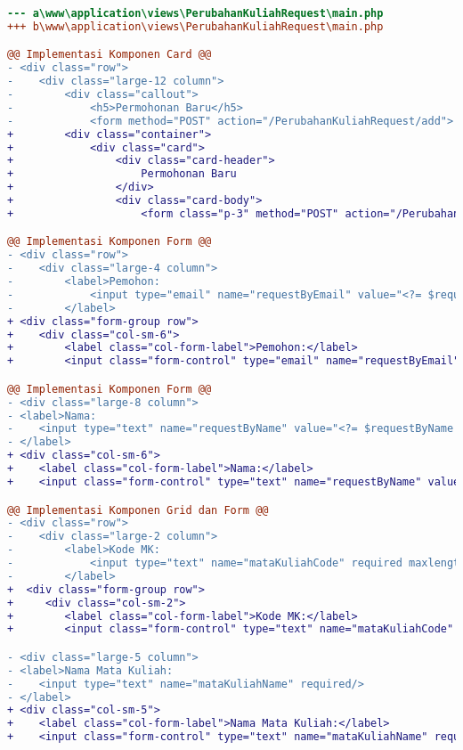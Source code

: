 \begin{lstlisting}[language=diff, caption=Perubahan file \path{\views\PerubahanKuliahRequest\main.php} , label=Entri, basicstyle=\ttfamily, frame=single,
columns=fullflexible, keepspaces=true, breaklines=true]
--- a\www\application\views\PerubahanKuliahRequest\main.php
+++ b\www\application\views\PerubahanKuliahRequest\main.php

@@ Implementasi Komponen Card @@
- <div class="row">
-    <div class="large-12 column">
-        <div class="callout">
-            <h5>Permohonan Baru</h5>
-            <form method="POST" action="/PerubahanKuliahRequest/add">
+        <div class="container">
+            <div class="card">
+                <div class="card-header">
+                    Permohonan Baru
+                </div>
+                <div class="card-body">
+                    <form class="p-3" method="POST" action="/PerubahanKuliahRequest/add">

@@ Implementasi Komponen Form @@
- <div class="row">
-    <div class="large-4 column">
-        <label>Pemohon:
-            <input type="email" name="requestByEmail" value="<?= $requestByEmail ?>" readonly="readonly"/>
-        </label>
+ <div class="form-group row">
+    <div class="col-sm-6">
+        <label class="col-form-label">Pemohon:</label>
+        <input class="form-control" type="email" name="requestByEmail" value="<?= $requestByEmail ?>" 

@@ Implementasi Komponen Form @@
- <div class="large-8 column">
- <label>Nama:
-    <input type="text" name="requestByName" value="<?= $requestByName ?>" readonly="readonly"/>
- </label>
+ <div class="col-sm-6">
+    <label class="col-form-label">Nama:</label>
+    <input class="form-control" type="text" name="requestByName" value="<?= $requestByName ?>" readonly="readonly"/>

@@ Implementasi Komponen Grid dan Form @@
- <div class="row">
-    <div class="large-2 column">
-        <label>Kode MK:
-            <input type="text" name="mataKuliahCode" required maxlength="9" pattern="[A-Z]{3}[0-9]{3}([0-9]{3})?" title="Kode MK dalam format XYZ123"/>
-        </label>
+  <div class="form-group row">
+     <div class="col-sm-2">
+        <label class="col-form-label">Kode MK:</label>
+        <input class="form-control" type="text" name="mataKuliahCode" required maxlength="9" pattern="[A-Z]{3}[0-9]{3}([0-9]{3})?" title="Kode MK dalam format XYZ123"/>

- <div class="large-5 column">
- <label>Nama Mata Kuliah:
-    <input type="text" name="mataKuliahName" required/>
- </label>
+ <div class="col-sm-5">
+    <label class="col-form-label">Nama Mata Kuliah:</label>
+    <input class="form-control" type="text" name="mataKuliahName" required/>


\end{lstlisting}
